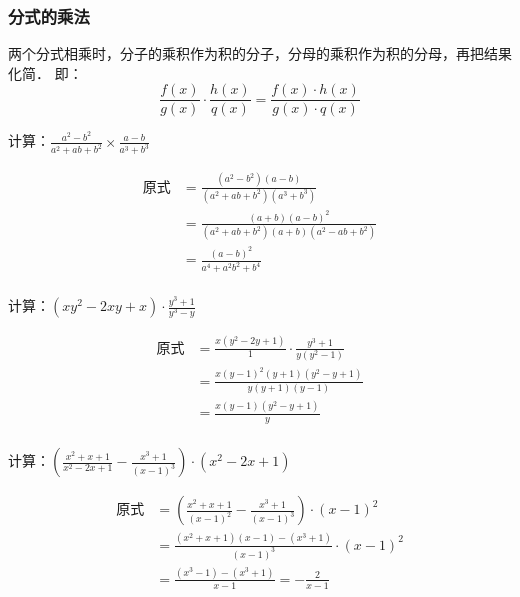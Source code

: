 \subsubsection{分式的乘法}

两个分式相乘时，分子的乘积作为积的分子，分母的乘积作为积的分母，再把结果化简．
即：
\[\frac{f(x)}{g(x)}\cdot \frac{h(x)}{q(x)}=\frac{f(x)\cdot h(x)}{g(x)\cdot q(x)} \]


\begin{example}
    计算：$\frac{a^{2}-b^{2}}{a^{2}+a b+b^{2}} \times \frac{a-b}{a^{3}+b^{3}}$
\end{example}


\begin{solution}
    \[\begin{split}
    \text{原式}&=\frac{\left(a^{2}-b^{2}\right)(a-b)}{\left(a^{2}+a b+b^{2}\right)\left(a^{3}+b^{3}\right)}   \\
    &=\frac{(a+b)(a-b)^{2}}{\left(a^{2}+a b+b^{2}\right)(a+b)\left(a^{2}-a b+b^{2}\right)}\\
    &=\frac{(a-b)^{2}}{a^{4}+a^{2} b^{2}+b^{4}}\\
\end{split}\]
\end{solution}

\begin{example}
    计算：$\left(x y^{2}-2 x y+x\right) \cdot \frac{y^{3}+1}{y^{3}-y}$
\end{example}

\begin{solution}
\[\begin{split}
    \text{原式}&=\frac{x(y^2-2y+1)}{1}\cdot \frac{y^3+1}{y(y^2-1)}   \\
    &= \frac{x(y-1)^2 (y+1)(y^2-y+1)}{y(y+1)(y-1)}  \\
    &= \frac{x(y-1)(y^2-y+1)}{y}         \\
\end{split}\]    
    
\end{solution}

\begin{example}
    计算：$\left(\frac{x^{2}+x+1}{x^{2}-2 x+1}-\frac{x^{3}+1}{(x-1)^{3}}\right)\cdot \left(x^{2}-2 x+1\right)$
\end{example}


\begin{solution}
    \[\begin{split}
        \text{原式}&=\left(\frac{x^{2}+x+1}{(x-1)^2}-\frac{x^{3}+1}{(x-1)^{3}}\right)\cdot (x-1)^2   \\
        &= \frac{(x^2+x+1)(x-1)-(x^3+1)}{(x-1)^3} \cdot (x-1)^2   \\
        &=\frac{(x^3-1)-(x^3+1)}{x-1}=-\frac{2}{x-1}
    \end{split}\]  
\end{solution}

